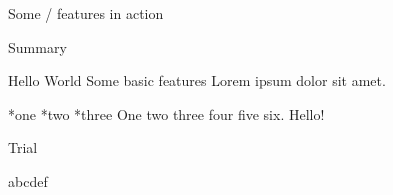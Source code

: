 \fontfam[LM fonts]
\typosize[11/13]

\tit Some \OpTeX/ features in action


\nonum\notoc\sec Summary

\maketoc

\chap Hello World
    \sec Some basic features
Lorem ipsum dolor sit amet.

\begitems
*one
*two
*three
\enditems
One two three four five six. Hello!

\sec Trial

abcdef

\bye

